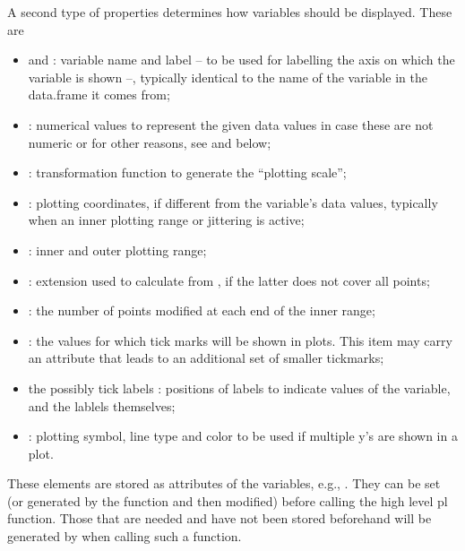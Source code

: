 \documentclass[11pt]{article}\usepackage[]{graphicx}\usepackage[]{color}
\begin{document}
A second type of properties determines how variables should be displayed.
These are
\begin{itemize}
\item
   and : variable name and label --  
  to be used for labelling the axis on which the variable is shown --, 
  typically identical to the name of the variable
  in the data.frame it comes from;
\item
  : numerical values to represent the given data values in
  case these are not numeric or for other reasons, see  and
   below;
\item
  : transformation function to generate the ``plotting scale'';    
\item
  : plotting coordinates, if different from the variable's data
  values, typically when an inner plotting range or jittering is active;
\item
  : inner and outer plotting range;
\item
  : extension used to calculate 
  from , if the latter does not cover all points;
\item 
  : the number of points modified at each end of the inner range;
\item
  : the values for which tick marks will be shown in plots.
  This item may carry an attribute  that leads to an additional
  set of smaller tickmarks;
\item
   the possibly tick labels :
  positions of labels to indicate values of the variable, and the lablels
  themselves;
\item
  : plotting symbol, line type and color to be used 
  if multiple y's are shown in a plot.
\end{itemize}
These elements are stored as attributes of the variables,
e.g., .
They can be set (or generated by the function  and 
then modified) before calling the high level pl function.
Those that are needed and have not been stored beforehand will be 
generated by  when calling such a function.
\end{document}
